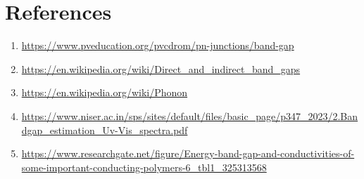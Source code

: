 \documentclass[a4paper, amsfonts, amssymb, amsmath, reprint, showkeys, nofootinbib, twoside]{revtex4-1}
\begin{document}
\section{References}
\begin{enumerate}
\item{\url{https://www.pveducation.org/pvcdrom/pn-junctions/band-gap}}
\item{\url{https://en.wikipedia.org/wiki/Direct_and_indirect_band_gaps}}
\item {\url{https://en.wikipedia.org/wiki/Phonon}}
\item{\url{https://www.niser.ac.in/sps/sites/default/files/basic_page/p347_2023/2.Bandgap_estimation_Uv-Vis_spectra.pdf}}
\item {\url{https://www.researchgate.net/figure/Energy-band-gap-and-conductivities-of-some-important-conducting-polymers-6_tbl1_325313568}}\label{x}

\end{enumerate}
\end{document}
